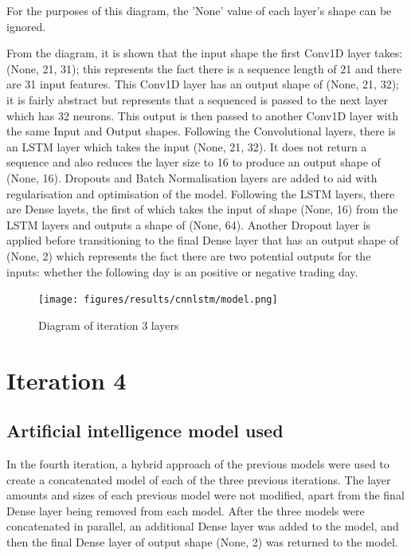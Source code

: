For the purposes of this diagram, the 'None' value of each layer's shape can be ignored.

From the diagram, it is shown that the input shape the first Conv1D layer takes: (None, 21, 31); this represents the
fact there is a sequence length of 21 and there are 31 input features.  This Conv1D layer has an output shape of (None, 21, 32); it is fairly abstract
but represents that a sequenced is passed to the next layer which has 32 neurons. This output is then passed to another
Conv1D layer with the same Input and Output shapes. Following the Convolutional layers, there is an LSTM layer
which takes the input (None, 21, 32). It does not return a sequence and also reduces the layer size to 16 to produce an
output shape of (None, 16). Dropouts and Batch Normalisation layers are added to aid with regularisation and optimisation of the model.
Following the LSTM layers, there are Dense layets, the first of which takes the input of shape (None, 16) from the
LSTM layers and outputs a shape of (None, 64). Another Dropout layer is applied before transitioning to the final Dense layer that has an output shape of (None, 2)
which represents the fact there are two potential outputs for the inputs: whether the following day
is an positive or negative trading day.

\begin{figure}[ht]
    \centering
    \texttt{[image: figures/results/cnnlstm/model.png]}
    \caption[Diagram of iteration 3 layers]{Diagram of iteration 3 layers}
    \label{fig:iteration3_model}
\end{figure}
\FloatBarrier

\section{Iteration 4}
\subsection{Artificial intelligence model used}\label{ssec:iteration4_ai_model}
In the fourth iteration, a hybrid approach of the previous models were used to create a concatenated model of each
of the three previous iterations. The layer amounts and sizes of each previous model were not modified, apart from
the final Dense layer being removed from each model. After the three models were concatenated in parallel,
an additional Dense layer was added to the model, and then the final Dense layer of output shape (None, 2) was returned to the model.

